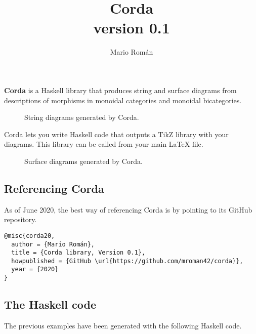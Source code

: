 \documentclass{article}
\title{Corda \\ \normalsize{\textsf{version 0.1}}}
\author{Mario Román}
\begin{document}
\maketitle

\textbf{Corda} is a Haskell library that produces string and surface diagrams from descriptions of morphisms in monoidal categories and monoidal bicategories.

\begin{figure}[h]
  \centering
  \assocOne \qquad
  \assocTwo
  \caption{String diagrams generated by Corda.}
\end{figure}

Corda lets you write Haskell code that outputs a TikZ library with your diagrams. This library can be called from your main LaTeX file.

\begin{figure}[h]
  \centering
  \associatorDiagram \quad
  \leftUnitorDiagram \quad
  \rightUnitorDiagram
  \caption{Surface diagrams generated by Corda.}
\end{figure}



\subsection*{Referencing Corda}

As of June 2020, the best way of referencing \textsf{Corda} is by pointing to its GitHub repository.

\begin{verbatim}
@misc{corda20,
  author = {Mario Román},
  title = {Corda library, Version 0.1},
  howpublished = {GitHub \url{https://github.com/mroman42/corda}},
  year = {2020}
}

\end{verbatim}


\subsection*{The Haskell code}

The previous examples have been generated with the following Haskell code.
\end{document}
